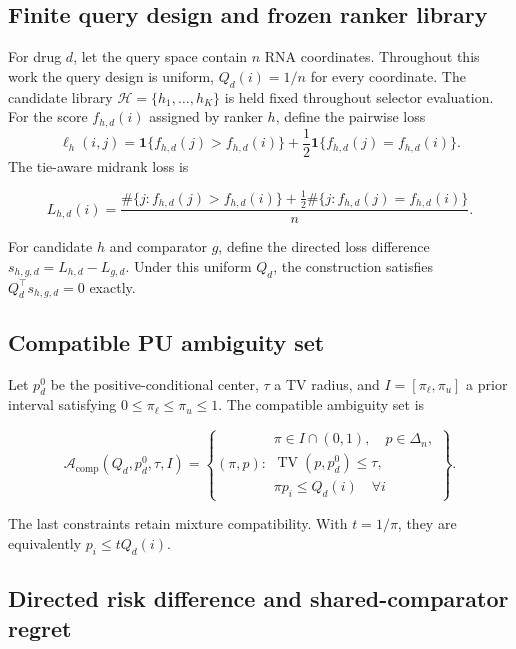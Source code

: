 \documentclass[preprint,review,12pt]{elsarticle}
\newcommand{\Acomp}{\mathcal{A}_{\mathrm{comp}}}
\newcommand{\Hlib}{\mathcal{H}}
\newcommand{\TV}{\operatorname{TV}}
\begin{document}
\subsection{Finite query design and frozen ranker library}

For drug \(d\), let the query space contain \(n\) RNA coordinates. Throughout
this work the query design is uniform, \(Q_d(i)=1/n\) for every coordinate.
The candidate library
\(\Hlib=\{h_1,\ldots,h_K\}\) is held fixed throughout selector evaluation. For the score
\(f_{h,d}(i)\) assigned by ranker \(h\), define the pairwise loss
\[
\ell_h(i,j)=
\mathbf{1}\{f_{h,d}(j)>f_{h,d}(i)\}
+\frac12\mathbf{1}\{f_{h,d}(j)=f_{h,d}(i)\}.
\]
The tie-aware midrank loss is

\begin{equation}
L_{h,d}(i)=\frac{\#\{j:f_{h,d}(j)>f_{h,d}(i)\}
  +\tfrac12\#\{j:f_{h,d}(j)=f_{h,d}(i)\}}{n}.
\label{eq:midrank-loss}
\end{equation}

For candidate \(h\) and comparator \(g\), define the directed loss difference
\(s_{h,g,d}=L_{h,d}-L_{g,d}\). Under this uniform \(Q_d\), the construction satisfies
\(Q_d^\top s_{h,g,d}=0\) exactly.

\subsection{Compatible PU ambiguity set}

Let \(p_d^0\) be the positive-conditional center, \(\tau\) a TV radius, and
\(I=[\pi_\ell,\pi_u]\) a prior interval satisfying
\(0\leq\pi_\ell\leq\pi_u\leq1\). The compatible ambiguity set is

\begin{equation}
\Acomp(Q_d,p_d^0,\tau,I)=
\left\{(\pi,p):
\begin{array}{l}
\pi\in I\cap(0,1),\quad p\in\Delta_n,\\
\TV(p,p_d^0)\leq\tau,\\
\pi p_i\leq Q_d(i)\quad\forall i
\end{array}\right\}.
\label{eq:compatible-set}
\end{equation}

The last constraints retain mixture compatibility. With \(t=1/\pi\), they are
equivalently \(p_i\leq tQ_d(i)\).

\subsection{Directed risk difference and shared-comparator regret}
\end{document}
